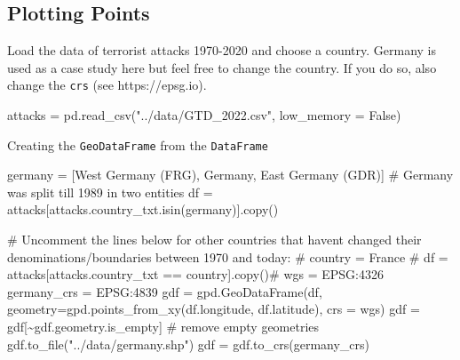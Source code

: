 \documentclass[
  letterpaper,
  DIV=11,
  numbers=noendperiod]{scrreprt}
\newenvironment{Shaded}{\begin{snugshade}}{\end{snugshade}}
\newcommand{\CommentTok}[1]{\textcolor[rgb]{0.37,0.37,0.37}{#1}}
\newcommand{\NormalTok}[1]{\textcolor[rgb]{0.00,0.23,0.31}{#1}}
\newcommand{\OperatorTok}[1]{\textcolor[rgb]{0.37,0.37,0.37}{#1}}
\newcommand{\StringTok}[1]{\textcolor[rgb]{0.13,0.47,0.30}{#1}}
\newcommand{\VariableTok}[1]{\textcolor[rgb]{0.07,0.07,0.07}{#1}}
\begin{document}
\hypertarget{plotting-points}{%
\subsection{Plotting Points}\label{plotting-points}}

Load the data of terrorist attacks 1970-2020 and choose a country.
Germany is used as a case study here but feel free to change the
country. If you do so, also change the \texttt{crs} (see
https://epsg.io).

\begin{Shaded}
\begin{Highlighting}[]
\NormalTok{attacks }\OperatorTok{=}\NormalTok{ pd.read\_csv(}\StringTok{"../data/GTD\_2022.csv"}\NormalTok{, low\_memory }\OperatorTok{=} \VariableTok{False}\NormalTok{)}
\end{Highlighting}
\end{Shaded}

Creating the \texttt{GeoDataFrame} from the \texttt{DataFrame}

\begin{Shaded}
\begin{Highlighting}[]
\NormalTok{germany }\OperatorTok{=}\NormalTok{ [}\StringTok{\textquotesingle{}West Germany (FRG)\textquotesingle{}}\NormalTok{, }\StringTok{\textquotesingle{}Germany\textquotesingle{}}\NormalTok{, }\StringTok{\textquotesingle{}East Germany (GDR)\textquotesingle{}}\NormalTok{] }\CommentTok{\# Germany was split till 1989 in two entities}
\NormalTok{df }\OperatorTok{=}\NormalTok{ attacks[attacks.country\_txt.isin(germany)].copy()}

\CommentTok{\# Uncomment the lines below for other countries that haven\textquotesingle{}t changed their denominations/boundaries between 1970 and today:}
\CommentTok{\# country = \textquotesingle{}France\textquotesingle{} }
\CommentTok{\# df = attacks[attacks.country\_txt == country].copy()\#}
\NormalTok{wgs }\OperatorTok{=} \StringTok{\textquotesingle{}EPSG:4326\textquotesingle{}}
\NormalTok{germany\_crs }\OperatorTok{=} \StringTok{\textquotesingle{}EPSG:4839\textquotesingle{}}
\NormalTok{gdf }\OperatorTok{=}\NormalTok{ gpd.GeoDataFrame(df, geometry}\OperatorTok{=}\NormalTok{gpd.points\_from\_xy(df.longitude, df.latitude), crs }\OperatorTok{=}\NormalTok{ wgs)}
\NormalTok{gdf }\OperatorTok{=}\NormalTok{ gdf[}\OperatorTok{\textasciitilde{}}\NormalTok{gdf.geometry.is\_empty] }\CommentTok{\# remove empty geometries}
\NormalTok{gdf.to\_file(}\StringTok{"../data/germany.shp"}\NormalTok{)}
\NormalTok{gdf }\OperatorTok{=}\NormalTok{ gdf.to\_crs(germany\_crs)}
\end{Highlighting}
\end{Shaded}
\end{document}
